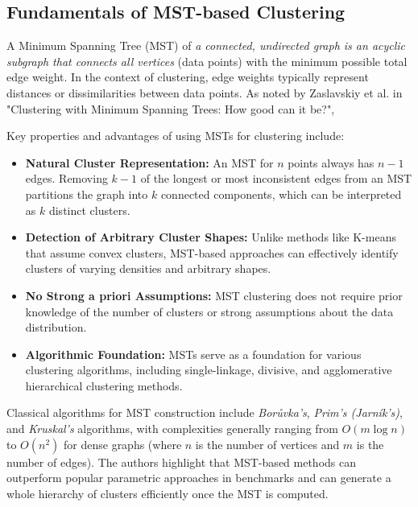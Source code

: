 \begin{multicols}{2}
\subsection{Fundamentals of MST-based Clustering}
A Minimum Spanning Tree (MST) of \textit{a connected, undirected graph is an acyclic subgraph that connects all vertices} (data points) with the minimum possible total edge weight. 
In the context of clustering, edge weights typically represent distances or dissimilarities between data points. As noted by Zaslavskiy et al. in "Clustering with Minimum Spanning Trees: How good can it be?"\cite{}, 

Key properties and advantages of using MSTs for clustering include:
\begin{itemize}
    \item \textbf{Natural Cluster Representation:} An MST for $n$ points always has $n-1$ edges. Removing $k-1$ of the longest or most inconsistent edges from an MST partitions the graph into $k$ connected components, which can be interpreted as $k$ distinct clusters.
    \item \textbf{Detection of Arbitrary Cluster Shapes:} Unlike methods like K-means that assume convex clusters, MST-based approaches can effectively identify clusters of varying densities and arbitrary shapes.
    \item \textbf{No Strong a priori Assumptions:} MST clustering does not require prior knowledge of the number of clusters or strong assumptions about the data distribution.
    \item \textbf{Algorithmic Foundation:} MSTs serve as a foundation for various clustering algorithms, including single-linkage, divisive, and agglomerative hierarchical clustering methods.
\end{itemize}

Classical algorithms for MST construction include \textit{Borůvka's}, \textit{Prim's (Jarník's)}, and \textit{Kruskal's} algorithms, with complexities generally ranging from $O(m \log n)$ to $O(n^2)$ for dense graphs 
(where $n$ is the number of vertices and $m$ is the number of edges). The authors highlight that MST-based methods can outperform popular parametric approaches in benchmarks and can generate a whole hierarchy of clusters efficiently once the MST is computed.


\end{multicols}
